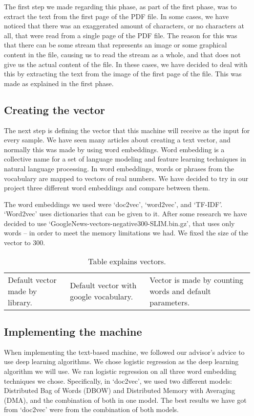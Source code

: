 \documentclass{article}
\begin{document}
\indent The first step we made regarding this phase, as part of the first phase, was to extract the text from the first page of the PDF file. In some cases, we have noticed that there was an exaggerated amount of characters, or no characters at all, that were read from a single page of the PDF file. The reason for this was that there can be some stream that represents an image or some graphical content in the file, causing us to read the stream as a whole, and that does not give us the actual content of the file. In these cases, we have decided to deal with this by extracting the text from the image of the first page of the file. This was made as explained in the first phase.

\subsection{Creating the vector}
\indent The next step is defining the vector that this machine will receive as the input for every sample. We have seen many articles about creating a text vector, and normally this was made by using word embeddings. Word embedding is a collective name for a set of language modeling and feature learning techniques in natural language processing. In word embeddings, words or phrases from the vocabulary are mapped to vectors of real numbers. We have decided to try in our project three different word embeddings and compare between them. 

\indent The word embeddings we used were ‘doc2vec’, ‘word2vec’, and ‘TF-IDF’.  ‘Word2vec’ uses dictionaries that can be given to it. After some research we have decided to use ‘GoogleNews-vectors-negative300-SLIM.bin.gz’, that uses only words – in order to meet the memory limitations we had. We fixed the size of the vector to 300.

\begin{table}[htb]
\centering
\begin{tabular}{|p{3.5cm}|p{3.5cm}|p{3.5cm}|}
\hline
\centering{Doc2Vec} & \centering{Word2Vec} & \centering{TF-IDF}\tabularnewline
\hline
\raggedright{Default vector made by library.} & \raggedright{Default vector with google vocabulary.} & \raggedright{Vector is made by counting words and default parameters.}\tabularnewline
\hline
\end{tabular}
\caption{Table explains vectors.}
\end{table}

\subsection{Implementing the machine}
\indent When implementing the text-based machine, we followed our advisor's advice to use deep learning algorithms. We chose logistic regression as the deep learning algorithm we will use. We ran logistic regression on all three word embedding techniques we chose. Specifically, in ‘doc2vec’, we used two different models: Distributed Bag of Words (DBOW) and Distributed Memory with Averaging (DMA), and the combination of both in one model. The best results we have got from ‘doc2vec’ were from the combination of both models.
\end{document}
